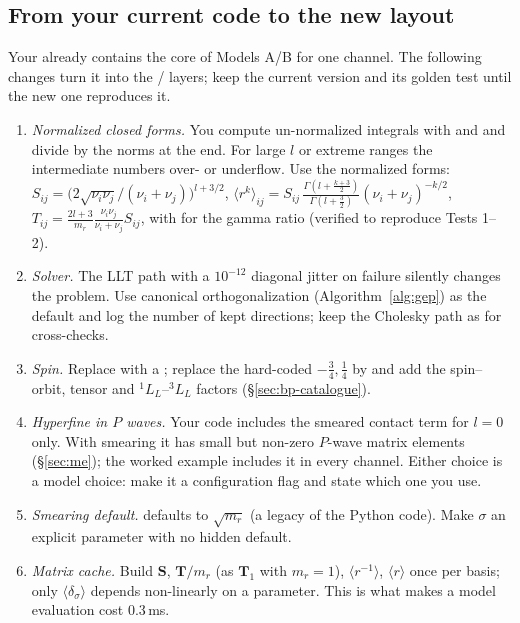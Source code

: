 \documentclass[11pt,a4paper]{article}
\numberwithin{equation}{section}
\theoremstyle{definition}
\theoremstyle{plain}
\theoremstyle{remark}
\numberwithin{algorithm}{section}
\newcommand{\mr}{m_r}
\newcommand{\mS}{\mathbf S}
\begin{document}
\subsection{From your current code to the new layout}\label{sec:bp-migrate}
Your  already contains the core of Models A/B for one channel. The following changes turn it into the / layers; keep the current version and its golden test until the new one reproduces it.
\begin{enumerate}[leftmargin=1.5em,itemsep=2pt]
\item \emph{Normalized closed forms.} You compute un-normalized integrals with  and  and divide by the norms at the end. For large $l$ or extreme ranges the intermediate numbers over- or underflow. Use the normalized forms: $S_{ij}=\big(2\sqrt{\nu_i\nu_j}/(\nu_i+\nu_j)\big)^{l+3/2}$, $\langle r^k\rangle_{ij}=S_{ij}\,\frac{\Gamma(l+\frac{k+3}2)}{\Gamma(l+\frac32)}(\nu_i+\nu_j)^{-k/2}$, $T_{ij}=\frac{2l+3}{\mr}\frac{\nu_i\nu_j}{\nu_i+\nu_j}S_{ij}$, with  for the gamma ratio (verified to reproduce Tests 1--2).
\item \emph{Solver.} The LLT path with a $10^{-12}$ diagonal jitter on failure silently changes the problem. Use canonical orthogonalization (Algorithm~\ref{alg:gep}) as the default and log the number of kept directions; keep the Cholesky path as  for cross-checks.
\item \emph{Spin.} Replace  with a ; replace the hard-coded $-\frac34,\frac14$ by  and add the spin--orbit, tensor and ${}^1L_L$--${}^3L_L$ factors (\S\ref{sec:bp-catalogue}).
\item \emph{Hyperfine in $P$ waves.} Your code includes the smeared contact term for $l=0$ only. With smearing it has small but non-zero $P$-wave matrix elements (\S\ref{sec:me}); the worked example includes it in every channel. Either choice is a model choice: make it a configuration flag and state which one you use.
\item \emph{Smearing default.}  defaults to $\sqrt{\mr}$ (a legacy of the Python code). Make $\sigma$ an explicit parameter with no hidden default.
\item \emph{Matrix cache.} Build $\mS$, $\mathbf T/\mr$ (as $\mathbf T_1$ with $\mr=1$), $\langle r^{-1}\rangle$, $\langle r\rangle$ once per basis; only $\langle\delta_\sigma\rangle$ depends non-linearly on a parameter. This is what makes a model evaluation cost $0.3\,$ms.
\end{enumerate}
\end{document}
